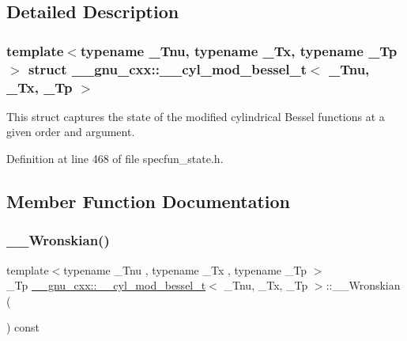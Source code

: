 \subsection{Detailed Description}
\subsubsection*{template$<$typename \+\_\+\+Tnu, typename \+\_\+\+Tx, typename \+\_\+\+Tp$>$\newline
struct \+\_\+\+\_\+gnu\+\_\+cxx\+::\+\_\+\+\_\+cyl\+\_\+mod\+\_\+bessel\+\_\+t$<$ \+\_\+\+Tnu, \+\_\+\+Tx, \+\_\+\+Tp $>$}

This struct captures the state of the modified cylindrical Bessel functions at a given order and argument. 

Definition at line 468 of file specfun\+\_\+state.\+h.



\subsection{Member Function Documentation}
\mbox{\label{struct____gnu__cxx_1_1____cyl__mod__bessel__t_a4e9bbc7f2cac91b245fda66b113fd5ac}} 
\subsubsection{\texorpdfstring{\+\_\+\+\_\+\+Wronskian()}{\_\_Wronskian()}}
{\footnotesize\ttfamily template$<$typename \+\_\+\+Tnu , typename \+\_\+\+Tx , typename \+\_\+\+Tp $>$ \\
\+\_\+\+Tp \hyperlink{struct____gnu__cxx_1_1____cyl__mod__bessel__t}{\+\_\+\+\_\+gnu\+\_\+cxx\+::\+\_\+\+\_\+cyl\+\_\+mod\+\_\+bessel\+\_\+t}$<$ \+\_\+\+Tnu, \+\_\+\+Tx, \+\_\+\+Tp $>$\+::\+\_\+\+\_\+\+Wronskian (\begin{DoxyParamCaption}{ }\end{DoxyParamCaption}) const\hspace{0.3cm}{\ttfamily [inline]}}



